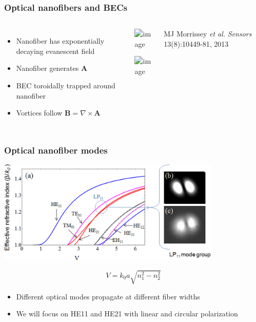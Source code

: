 \documentclass{beamer}
\begin{document}
\begin{frame}
\frametitle{Optical nanofibers and BECs}

\begin{columns}

\begin{itemize}
\item Nanofiber has exponentially decaying evanescent field
\item Nanofiber generates $\mathbf{A}$
\item BEC toroidally trapped around nanofiber
\item Vortices follow $\mathbf{B} = \nabla \times \mathbf{A}$
\end{itemize}

\begin{center}
\includegraphics<1>[width=\textwidth]{nanofiber_1}

\includegraphics<2>[width=\textwidth]{nanofiber_2}
\end{center}

\tiny MJ Morrissey \textit{et al.} \textit{Sensors} 13(8):10449-81, 2013
\end{columns}

\end{frame}

\begin{frame}
\frametitle{Optical nanofiber modes}
\center \includegraphics[width=0.8\textwidth]{../data/3d/fiber/mode_plot.jpg}

$$
V = k_0a\sqrt{n_1^2 - n_2^2}
$$
\pause
\begin{itemize}
\item Different optical modes propagate at different fiber widths
\item We will focus on HE11 and HE21 with linear and circular polarization
\end{itemize}
\end{frame}
\end{document}
